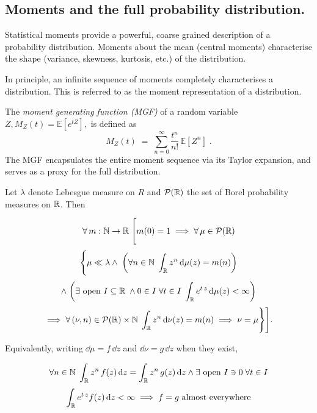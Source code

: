 {{    \subsection{Moments and the full probability distribution.}
        Statistical moments provide a powerful, coarse grained description of a probability distribution.
        Moments about the mean (central moments) characterise the shape (variance, skewness, kurtosis, etc.) of the distribution.
        
        In principle, an infinite sequence of moments completely characterises a distribution.
        This is referred to as the moment representation of a distribution.

        \begin{definition}
            The\emph{ moment generating function (MGF)} of a random variable \(Z, M_Z(t) = \mathbb{E}[e^{tZ}],\) is defined as
            \[
                M_Z(t) \;=\; \sum_{n=0}^\infty \frac{t^n}{n!}\,\mathbb{E}[Z^n]\;.
            \]
            The MGF encapsulates the entire moment sequence via its Taylor expansion, and serves as a proxy for the full distribution.
        \end{definition}
        
\begin{theorem}
\noproofref
\label{thm:moment-determinacy-mgf}
Let $\lambda$ denote Lebesgue measure on $R$ and $\mathcal{P}(\mathbb{R})$ the set of Borel probability measures on $\mathbb{R}$. Then

\[
\forall\, m:\mathbb{N}\to\mathbb{R}\;\Bigg[
    m(0) = 1 \implies \forall\, \mu\in\mathcal{P}(\mathbb{R})\]
    \[\nonumber\Bigg\{
        \mu\ll\lambda
        \land\;\qty(
            \forall n\in\mathbb{N}\; \int_{\mathbb{R}} z^n\,\dd\mu(z)=m(n))
    \]
    \[\nonumber \land\;\qty(\exists\text{ open }I\subseteq\mathbb{R}\;\land 0\in I\;\forall t\in I\;
\int_{\mathbb{R}} e^{t\,z}\,\dd\mu(z)<\infty)\]
\[\nonumber
\implies \forall\, (\nu, n)\in\mathcal{P}(\mathbb{R})\times\mathbb{N}\;\int_{\mathbb{R}} z^n\,\dd\nu(z)=m(n)
\implies \nu=\mu\Bigg\}\Bigg].
\]

Equivalently, writing $\dd\mu=f\,\dd z$ and $\dd\nu=g\,\dd z$ when they exist,

\[
\forall n\in\mathbb{N}\; \int_{\mathbb{R}} z^n\, f(z)\,\dd z=\int_{\mathbb{R}} z^n\, g(z)\,\dd z \land \exists\text{ open }I\ni 0\;\forall t\in I
\]
\[\nonumber
\int_{\mathbb{R}} e^{t\,z} f(z)\,\dd z<\infty
\implies f=g\ \text{almost everywhere}
\]
\end{theorem}
        
}}
